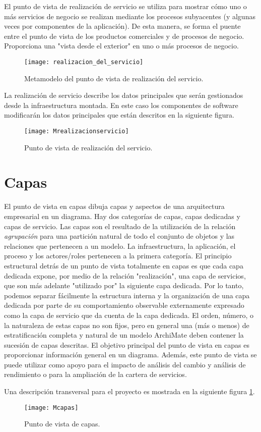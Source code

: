 El punto de vista de realización de servicio se utiliza para mostrar cómo uno o más servicios de negocio se realizan mediante los procesos subyacentes (y algunas veces por componentes de la aplicación). De esta manera, se forma el puente entre el punto de vista de los productos comerciales y de procesos de negocio. Proporciona una "vista desde el exterior" en uno o más procesos de negocio.

\begin{figure}[H]
\centering
\texttt{[image: realizacion\_del\_servicio]}
\caption{Metamodelo del punto de vista de realización del servicio.}
\end{figure}

La realización de servicio describe los datos principales que serán gestionados desde la infraestructura montada. En este caso los componentes de software modificarán los datos principales que están descritos en la siguiente figura.

\begin{figure}[H]
\centering
\texttt{[image: Mrealizacionservicio]}
\caption{Punto de vista de realización del servicio.}
\end{figure}

\section{Capas}
El punto de vista en capas dibuja capas y aspectos de una arquitectura empresarial en un diagrama. Hay dos categorías de capas, capas dedicadas y capas de servicio. Las capas son el resultado de la utilización de la relación \textit{agrupación} para una partición natural de todo el conjunto de objetos y las relaciones que pertenecen a un modelo. La infraestructura, la aplicación, el proceso y los actores/roles pertenecen a la primera categoría. El principio estructural detrás de un punto de vista totalmente en capas es que cada capa dedicada expone, por medio de la relación "realización", una capa de servicios, que son más adelante "utilizado por" la siguiente capa dedicada. Por lo tanto, podemos separar fácilmente la estructura interna y la organización de una capa dedicada por parte de su comportamiento observable externamente expresado como la capa de servicio que da cuenta de la capa dedicada. El orden, número, o la naturaleza de estas capas no son fijos, pero en general una (más o menos) de estratificación completa y natural de un modelo ArchiMate deben contener la sucesión de capas descritas. El objetivo principal del punto de vista en capas es proporcionar información general en un diagrama. Además, este punto de vista se puede utilizar como apoyo para el impacto de análisis del cambio y análisis de rendimiento o para la ampliación de la cartera de servicios.

Una descripción transversal para el proyecto es mostrada en la siguiente figura \ref{mcapas}.


\begin{figure}[h]
\centering
\texttt{[image: Mcapas]}
\caption{Punto de vista de capas.}
\label{mcapas}
\end{figure}

